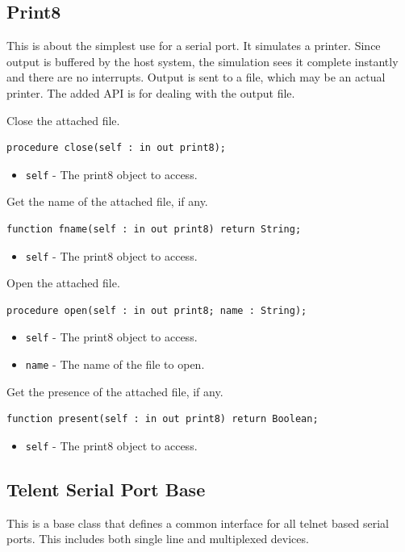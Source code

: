 \documentclass[10pt, openany]{book}
\newcommand{\keyword}[1]{\texttt{#1}}
\begin{document}
\subsection{Print8}
This is about the simplest use for a serial port.
It simulates a printer.
Since output is buffered by the host system, the simulation sees it complete instantly and there are no interrupts.
Output is sent to a file, which may be an actual printer.
The added API is for dealing with the output file.

Close the attached file.
\begin{lstlisting}
procedure close(self : in out print8);
\end{lstlisting}
\begin{itemize}
  \item \keyword{self} - The print8 object to access.
\end{itemize}

Get the name of the attached file, if any.
\begin{lstlisting}
function fname(self : in out print8) return String;
\end{lstlisting}
\begin{itemize}
  \item \keyword{self} - The print8 object to access.
\end{itemize}

Open the attached file.
\begin{lstlisting}
procedure open(self : in out print8; name : String);
\end{lstlisting}
\begin{itemize}
  \item \keyword{self} - The print8 object to access.
  \item \keyword{name} - The name of the file to open.
\end{itemize}

Get the presence of the attached file, if any.
\begin{lstlisting}
function present(self : in out print8) return Boolean;
\end{lstlisting}
\begin{itemize}
  \item \keyword{self} - The print8 object to access.
\end{itemize}

\subsection{Telent Serial Port Base}
\label{sec:tel-base}
This is a base class that defines a common interface for all telnet based serial ports.
This includes both single line and multiplexed devices.
\end{document}
